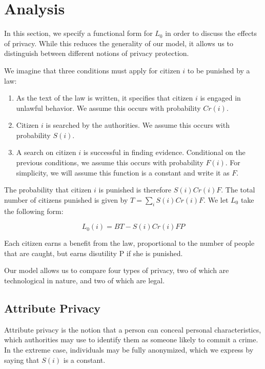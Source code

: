 
\section{Analysis}
\label{sec:analysis}




In this section, we specify a functional form for $L_0$ in order to discuss the effects of privacy.  While this reduces the generality of our model, it allows us to distinguish between different notions of privacy protection.  

We imagine that three conditions must apply for citizen $i$ to be punished by a law:

\begin{enumerate}
\item As the text of the law is written, it specifies that citizen $i$ is engaged in unlawful behavior.  We assume this occurs with probability $Cr(i)$.
\item Citizen $i$ is searched by the authorities.  We assume this occurs with probability $S(i)$.
\item A search on citizen $i$ is successful in finding evidence.  Conditional on the previous conditions, we assume this occurs with probability $F(i)$.  For simplicity, we will assume this function is a constant and write it as $F$.
\end{enumerate}

The probability that citizen $i$ is punished is therefore $S(i)Cr(i)F$.  The total number of citizens punished is given by $T = \sum_i S(i)Cr(i)F$.  We let $L_0$ take the following form:

$$L_0(i) = BT - S(i)Cr(i)FP$$

Each citizen earns a benefit from the law, proportional to the number of people that are caught, but earns disutility P if she is punished.

Our model allows us to compare four types of privacy, two of which are technological in nature, and two of which are legal.

\subsection{Attribute Privacy}

Attribute privacy is the notion that a person can conceal personal characteristics, which authorities may use to identify them as someone likely to commit a crime.  In the extreme case, individuals may be fully anonymized, which we express by saying that $S(i)$ is a constant. 

